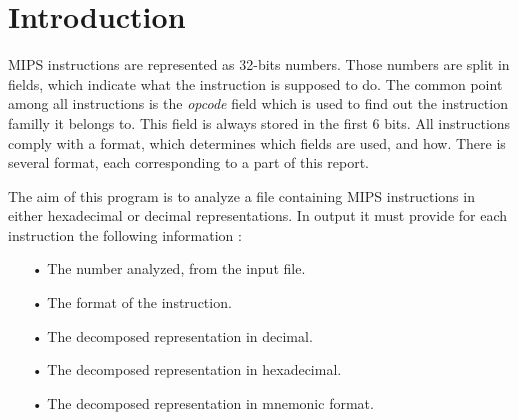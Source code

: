 \section*{Introduction}

MIPS instructions are represented as 32-bits numbers. Those numbers are split in fields, which indicate what the instruction is supposed to do. The common point among all instructions is the \textit{opcode} field which is used to find out the instruction familly it belongs to. This field is always stored in the first 6 bits. All instructions comply with a format, which determines which fields are used, and how. There is several format, each corresponding to a part of this report.

The aim of this program is to analyze a file containing MIPS instructions in either hexadecimal or decimal representations. In output it must provide for each instruction the following information :
\begin{itemize}
\item[•] The number analyzed, from the input file.
\item[•] The format of the instruction.
\item[•] The decomposed representation in decimal.
\item[•] The decomposed representation in hexadecimal.
\item[•] The decomposed representation in mnemonic format.
\end{itemize}